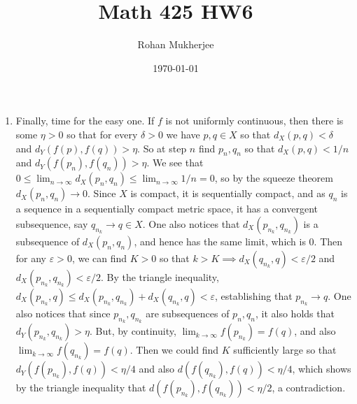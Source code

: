 \documentclass[12pt]{article}
\title{Math 425 HW6}
\date{\today}
\author{Rohan Mukherjee}
\def \ve{\varepsilon}
\theoremstyle{definition}
\theoremstyle{remark}
\begin{document}
	\maketitle
	\begin{enumerate}[leftmargin=\labelsep]
		\item Finally, time for the easy one. If $f$ is not uniformly continuous, then there is some $\eta > 0$ so that for every $\delta > 0$ we have $p, q \in X$ so that $d_X(p, q) < \delta$ and $d_Y(f(p), f(q)) > \eta$. So at step $n$ find $p_n, q_n$ so that $d_X(p, q) < 1/n$ and $d_Y(f(p_n), f(q_n)) > \eta$. We see that $0 \leq \lim_{n \to \infty} d_X(p_n, q_n) \leq \lim_{n \to \infty} 1/n = 0$, so by the squeeze theorem $d_X(p_n, q_n) \to 0$. Since $X$ is compact, it is sequentially compact, and as $q_n$ is a sequence in a sequentially compact metric space, it has a convergent subsequence, say $q_{n_k} \to q \in X$. One also notices that $d_X(p_{n_k}, q_{n_k})$ is a subsequence of $d_X(p_n, q_n)$, and hence has the same limit, which is 0. Then for any $\ve > 0$, we can find $K > 0$ so that $k > K \implies d_X(q_{n_k}, q) < \ve/2$ and $d_X(p_{n_k}, q_{n_k}) < \ve/2$. By the triangle inequality, $d_X(p_{n_k}, q) \leq d_X(p_{n_k}, q_{n_k}) + d_X(q_{n_k}, q) < \ve$, establishing that $p_{n_k} \to q$. One also notices that since $p_{n_k}, q_{n_k}$ are subsequences of $p_n, q_n$, it also holds that $d_Y(p_{n_k}, q_{n_k}) > \eta$. But, by continuity, $\lim_{k \to \infty} f(p_{n_k}) = f(q)$, and also $\lim_{k \to \infty} f(q_{n_k}) = f(q)$. Then we could find $K$ sufficiently large so that $d_Y(f(p_{n_k}), f(q)) < \eta/4$ and also $d(f(q_{n_k}), f(q)) < \eta/4$, which shows by the triangle inequality that $d(f(p_{n_k}), f(q_{n_k})) < \eta/2$, a contradiction.
		

\end{enumerate}
\end{document}
